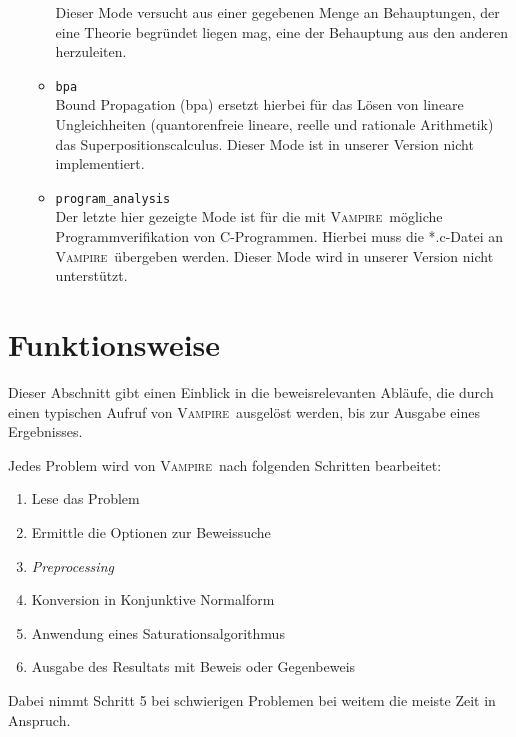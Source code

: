 \documentclass{article}
\newcommand{\vampire}{\textsc{Vampire}~}
\begin{document}
\begin{itemize}
\begin{itemize}
	Dieser Mode versucht aus einer gegebenen Menge an Behauptungen, der eine Theorie begründet liegen mag, eine der Behauptung aus den anderen herzuleiten.
	\item \verb|bpa| \\
	Bound Propagation (bpa) ersetzt hierbei für das Lösen von lineare Ungleichheiten (quantorenfreie lineare, reelle und rationale Arithmetik) das Superpositionscalculus.
	Dieser Mode ist in unserer Version nicht implementiert.
	\item \verb|program_analysis| \\
	Der letzte hier gezeigte Mode ist für die mit \vampire mögliche Programmverifikation von C-Programmen. Hierbei muss die *.c-Datei an \vampire übergeben werden.
	Dieser Mode wird in unserer Version nicht unterstützt.
\end{itemize}
\end{itemize} %



\section{Funktionsweise}
\label{sec:mechanics}

Dieser Abschnitt gibt einen Einblick in die beweisrelevanten Abläufe, die durch einen typischen Aufruf von \vampire ausgelöst werden, bis zur Ausgabe eines Ergebnisses.

Jedes Problem wird von \vampire nach folgenden Schritten bearbeitet: \cite[S. 9]{cav2013}

\begin{enumerate}
	\itemsep-0.3em 
	\item Lese das Problem
	\item Ermittle die Optionen zur Beweissuche
	\item \emph{Preprocessing}
	\item Konversion in Konjunktive Normalform
	\item Anwendung eines Saturationsalgorithmus
	\item Ausgabe des Resultats mit Beweis oder Gegenbeweis
\end{enumerate}
Dabei nimmt Schritt 5 bei schwierigen Problemen bei weitem die meiste Zeit in Anspruch.
\end{document}
